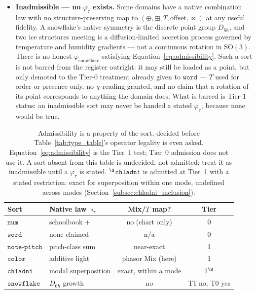 \documentclass[12pt, a4paper]{article}
\begin{document}
\begin{itemize}
    \item \textbf{Inadmissible --- no $\varphi_\tau$ exists.} Some
    domains have a native combination law with no structure-preserving
    map to $(\oplus,\boxplus,T,\text{offset},\bowtie)$ at any useful fidelity.
    A snowflake's native symmetry is the discrete point group
    $D_{6h}$, and two ice structures meeting is a diffusion-limited
    accretion process governed by temperature and humidity gradients
    --- not a continuous rotation in $\mathrm{SO}(3)$. There is no
    honest $\varphi_{\mathrm{snowflake}}$ satisfying
    Equation~\eqref{eq:admissibility}. Such a sort is not barred from
    the register outright: it may still be loaded as a point, but
    only demoted to the Tier-0 treatment already given to
    $\mathtt{word}$ --- $T$ used for order or presence only, no
    $\chi$-reading granted, and no claim that a rotation of its point
    corresponds to anything the domain does. What is barred is Tier-1
    status: an inadmissible sort may never be handed a stated
    $\varphi_\tau$, because none would be true.
\end{itemize}

\begin{table}[h]
\centering
\begin{tabular}{llcc}
\hline
Sort & Native law $\circ_\tau$ & Mix/$T$ map? & Tier \\
\hline
$\mathtt{num}$   & schoolbook $+$ & no (chart only) & 0 \\
$\mathtt{word}$  & none claimed & n/a & 0 \\
$\mathtt{note\text{-}pitch}$ & pitch-class sum & near-exact & 1 \\
$\mathtt{color}$ & additive light & phasor Mix (here) & 1 \\
$\mathtt{chladni}$ & modal superposition & exact, within a mode & 1$^{\S}$ \\
$\mathtt{snowflake}$ & $D_{6h}$ growth & no & T1 no; T0 yes \\
\hline
\end{tabular}
\caption{Admissibility is a property of the sort, decided before
Table~\ref{tab:type_table}'s operator legality is even asked.
Equation~\eqref{eq:admissibility} is the Tier~1 test; Tier~0
admission does not use it. A sort
absent from this table is undecided, not admitted; treat it as
inadmissible until a $\varphi_\tau$ is stated.
$^{\S}$$\mathtt{chladni}$ is admitted at Tier~1 with a stated
restriction: exact for superposition within one mode, undefined across
modes (Section~\ref{subsec:chladni_inclusion}).}
\label{tab:admissibility}
\end{table}
\end{document}
